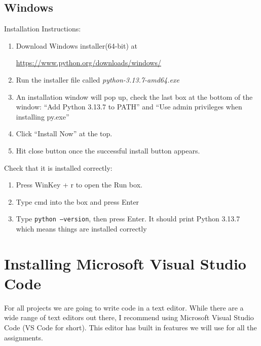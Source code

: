 \documentclass[12pt]{article}
\begin{document}
\subsection{Windows}
Installation Instructions: 
\begin{enumerate}
\item Download Windows installer(64-bit) at

  \url{https://www.python.org/downloads/windows/}

\item Run the installer file called \textit{python-3.13.7-amd64.exe}
\item An installation window will pop up, check the last box at the bottom of the window: ``Add Python 3.13.7 to PATH'' and ``Use admin privileges when installing py.exe''
\item Click ``Install Now'' at the top.
  \item Hit close button once the successful install button appears.
\end{enumerate}

Check that it is installed correctly: 
\begin{enumerate}
\item Press WinKey + r to open the Run box.
\item Type cmd into the box and press Enter
  \item Type \texttt{python --version}, then press Enter. It should print Python 3.13.7 which means things are installed correctly
\end{enumerate}


\section{Installing Microsoft Visual Studio Code}
For all projects we are going to write code in a text editor. While there are a wide range of text editors out there, I recommend using Microsoft Visual Studio Code (VS Code for short).
This editor has built in features we will use for all the assignments.
\end{document}
